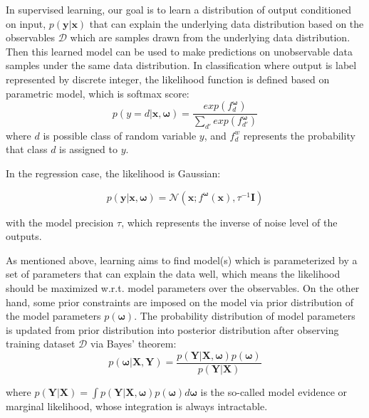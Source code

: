 In supervised learning, our goal is to learn a distribution of output conditioned on input, $p(\mathbf{y}|\mathbf{x})$ that can explain the underlying data distribution based on the observables $\mathcal{D}$ which are samples drawn from the underlying data distribution. Then this learned model can be used to make predictions on unobservable data samples under the same data distribution. In classification where output is label represented by discrete integer, the likelihood function is defined based on parametric model, which is softmax score:
\begin{equation}
p(y = d|\mathbf{x}, \boldsymbol{\omega}) = \frac{exp(f^{\boldsymbol{\omega}}_{d})}{\sum_{d'}exp(f^{\boldsymbol{\omega}}_{d'})}  \label{2.1}
\end{equation}
where $d$ is possible class of random variable $y$, and $f^w_d$ represents the probability that class $d$ is assigned to $y$.  

In the regression case, the likelihood is Gaussian:

\begin{equation}
p(\mathbf{y}|\mathbf{x}, \boldsymbol{\omega}) = \mathcal{N}(\mathbf{x}; f^{\boldsymbol{\omega}}(\mathbf{x}), \tau^{-1}\textbf{I}) 
\label{2.2}
\end{equation}

with the model precision $\tau$, which represents the inverse of noise level of the outputs.

As mentioned above, learning aims to find model(s) which is parameterized by a set of parameters that can explain the data well, which means the likelihood should be maximized w.r.t. model parameters over the observables. On the other hand, some prior constraints are imposed on the model via prior distribution of the model parameters $p(\boldsymbol{\omega})$. The probability distribution of model parameters is updated from prior distribution into posterior distribution after observing training dataset $\mathcal{D}$ via Bayes' theorem:
\begin{equation}
p(\boldsymbol{\omega}|\mathbf{X}, \mathbf{Y}) = \frac{p(\mathbf{Y}|\mathbf{X}, \boldsymbol{\omega})p(\boldsymbol{\omega})}{p(\mathbf{Y}|\mathbf{X})}
\label{2.3}
\end{equation}

where $p(\mathbf{Y}| \mathbf{X}) = \int p(\mathbf{Y}| \mathbf{X}, \boldsymbol{\omega})p(\boldsymbol{\omega})d\boldsymbol{\omega}$ is the so-called model evidence or marginal likelihood, whose integration is always intractable.

